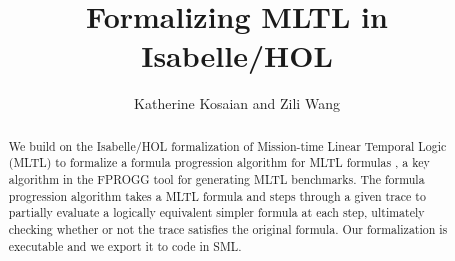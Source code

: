 \documentclass[11pt,a4paper]{article}
\begin{document}
\title{Formalizing MLTL in Isabelle/HOL}
\author{Katherine Kosaian and Zili Wang}
\maketitle

\begin{abstract}
  We build on the Isabelle/HOL formalization of Mission-time Linear Temporal Logic (MLTL) to formalize a formula progression algorithm for MLTL formulas \cite{LR18}, a key algorithm in the FPROGG tool \cite{RR25} for generating MLTL benchmarks.
  The formula progression algorithm takes a MLTL formula and steps through a given trace to partially evaluate a logically equivalent simpler formula at each step, ultimately checking whether or not the trace satisfies the original formula.
  Our formalization is executable and we export it to code in SML.
\end{abstract}

\tableofcontents





\end{document}
